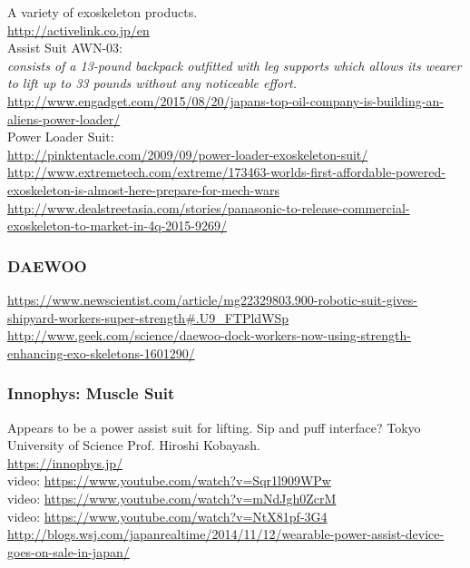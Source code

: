 \noindent
A variety of exoskeleton products.\\
\url{http://activelink.co.jp/en}\\

Assist Suit AWN-03:\\
{\it consists of a 13-pound backpack outfitted with leg supports which allows its wearer to lift up to 33 pounds without any noticeable effort.}\\
\url{http://www.engadget.com/2015/08/20/japans-top-oil-company-is-building-an-aliens-power-loader/}\\

Power Loader Suit:\\
\url{http://pinktentacle.com/2009/09/power-loader-exoskeleton-suit/}\\
\url{http://www.extremetech.com/extreme/173463-worlds-first-affordable-powered-exoskeleton-is-almost-here-prepare-for-mech-wars}\\
\url{http://www.dealstreetasia.com/stories/panasonic-to-release-commercial-exoskeleton-to-market-in-4q-2015-9269/}\\

\subsubsection{DAEWOO}

\noindent
\url{https://www.newscientist.com/article/mg22329803.900-robotic-suit-gives-shipyard-workers-super-strength#.U9_FTPldWSp}\\
\url{http://www.geek.com/science/daewoo-dock-workers-now-using-strength-enhancing-exo-skeletons-1601290/}\\

\subsubsection{Innophys: Muscle Suit}

\noindent
Appears to be a power assist suit for lifting. Sip and puff interface?
Tokyo University of Science Prof. Hiroshi Kobayash.\\
\url{https://innophys.jp/}\\
video: \url{https://www.youtube.com/watch?v=Sqr1l909WPw}\\
video: \url{https://www.youtube.com/watch?v=mNdJgh0ZcrM}\\
video: \url{https://www.youtube.com/watch?v=NtX81pf-3G4}\\
\url{http://blogs.wsj.com/japanrealtime/2014/11/12/wearable-power-assist-device-goes-on-sale-in-japan/}

